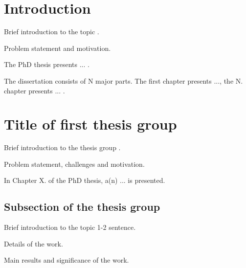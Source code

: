 \documentclass[12pt,a4paper]{extarticle}
\begin{document}
\nobibliography*


 
\newpage
\thispagestyle{empty}
\mbox{}

\newpage

\setcounter{page}{1}
 
\newpage
\section{Introduction}

Brief introduction to the topic \cite{b:arrl}. 

Problem statement and motivation.

The PhD thesis presents ... .

The dissertation consists of N major parts. The first chapter presents ..., the N. chapter presents ... .

\section{Title of first thesis group}

Brief introduction to the thesis group \cite{b:duckworth99}.

Problem statement, challenges and motivation.

In Chapter X. of the PhD thesis, a(n) ... is presented.

\subsection{Subsection of the thesis group}


Brief introduction to the topic 1-2 sentence.

Details of the work.

Main results and significance of the work.
\end{document}
